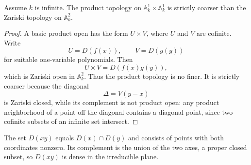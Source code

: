 \begin{center}
\end{center}

\begin{proposition}
Assume \(k\) is infinite.  The product topology on
\(\mathbb A_k^1\times\mathbb A_k^1\) is strictly coarser than the Zariski topology on
\(\mathbb A_k^2\).
\end{proposition}

\begin{proof}
A basic product open has the form \(U\times V\), where \(U\) and \(V\) are cofinite.
Write
\[
U=D(f(x)),\qquad V=D(g(y))
\]
for suitable one-variable polynomials.  Then
\[
U\times V=D(f(x)g(y)),
\]
which is Zariski open in \(\mathbb A_k^2\).  Thus the product topology is no finer.
It is strictly coarser because the diagonal
\[
\Delta=V(y-x)
\]
is Zariski closed, while its complement is not product open: any product neighborhood of a
point off the diagonal contains a diagonal point, since two cofinite subsets of an infinite
set intersect.
\end{proof}

\begin{example}\label{ex:vi02-expand-03}
The set $D(xy)$ equals $D(x)\cap D(y)$ and consists of points with both coordinates nonzero.  Its complement is the union of the two axes, a proper closed subset, so $D(xy)$ is dense in the irreducible plane.
\end{example}
